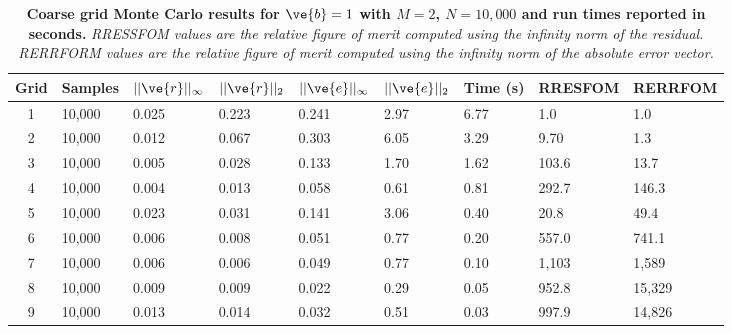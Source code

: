 \documentclass[note]{TechNote}
\begin{document}
\begin{table}[h!]
  \begin{center}
    \begin{tabular}{cllllllll}\hline\hline
      \multicolumn{1}{c}{\textbf{Grid}} &
      \multicolumn{1}{l}{\textbf{Samples}} &
      \multicolumn{1}{l}{\textbf{$||\ve{r}||_{\infty}$}} &
      \multicolumn{1}{l}{\textbf{$||\ve{r}||_{2}$}} &
      \multicolumn{1}{l}{\textbf{$||\ve{e}||_{\infty}$}} &
      \multicolumn{1}{l}{\textbf{$||\ve{e}||_{2}$}} &
      \multicolumn{1}{l}{\textbf{Time (s)}} &
      \multicolumn{1}{l}{\textbf{RRESFOM}} &
      \multicolumn{1}{l}{\textbf{RERRFOM}} \\
      \hline
      1 & 10,000 & 0.025 & 0.223 & 0.241 & 2.97 & 6.77 & 1.0 & 1.0 \\
      2 & 10,000 & 0.012 & 0.067 & 0.303 & 6.05 & 3.29 & 9.70 & 1.3 \\
      3 & 10,000 & 0.005 & 0.028 & 0.133 & 1.70 & 1.62 & 103.6 & 13.7 \\
      4 & 10,000 & 0.004 & 0.013 & 0.058 & 0.61 & 0.81 & 292.7 & 146.3 \\
      5 & 10,000 & 0.023 & 0.031 & 0.141 & 3.06 & 0.40 & 20.8 & 49.4 \\
      6 & 10,000 & 0.006 & 0.008 & 0.051 & 0.77 & 0.20 & 557.0 & 741.1 \\
      7 & 10,000 & 0.006 & 0.006 & 0.049 & 0.77 & 0.10 & 1,103 & 1,589 \\
      8 & 10,000 & 0.009 & 0.009 & 0.022 & 0.29 & 0.05 & 952.8 & 15,329 \\
      9 & 10,000 & 0.013 & 0.014 & 0.032 & 0.51 & 0.03 & 997.9 &
      14,826 \\
      \hline\hline
    \end{tabular}
  \end{center}
  \caption{\textbf{Coarse grid Monte Carlo results for
      $\ve{b} = 1$ with $M = 2$, $N = 10,000$ and run times reported
      in seconds.} \textit{RRESSFOM values are the relative figure of
      merit computed using the infinity norm of the residual. RERRFORM
    values are the relative figure of merit computed using the
    infinity norm of the absolute error vector.}}
  \label{tab:heterogeneous_cg_solutions}
\end{table}
\end{document}

